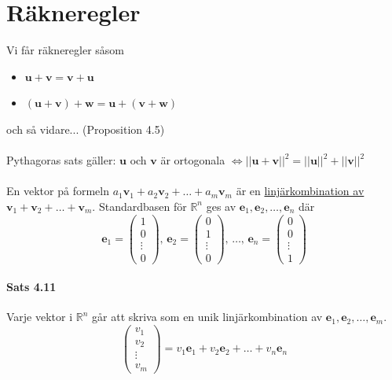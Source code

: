\clearpage

\section{Räkneregler}
Vi får räkneregler såsom
\begin{itemize}
    \item[] $\bm{u}+\bm{v}=\bm{v}+\bm{u}$
    \item[] $(\bm{u}+\bm{v})+\bm{w}=\bm{u}+(\bm{v}+\bm{w})$
\end{itemize}
och så vidare... (Proposition 4.5)\\
\\
Pythagoras sats gäller: $\bm{u}$ och $\bm{v}$ är ortogonala $\Leftrightarrow ||\bm{u}+\bm{v}||^{2}=||\bm{u}||^{2}+||\bm{v}||^{2}$\\
\\
En vektor på formeln $a_{1}\bm{v}_{1}+a_{2}\bm{v}_{2}+\ldots+a_{m}\bm{v}_{m}$ är en \underline{linjärkombination av $\bm{v}_{1}+\bm{v}_{2}+\ldots+\bm{v}_{m}$}.
Standardbasen för $\mathbb{R}^{n}$ ges av $\bm{e}_{1}, \bm{e}_{2}, \ldots, \bm{e}_{n}$ där 
\begin{equation*}
    \bm{e}_{1}=\begin{pmatrix}
        1\\0\\\vdots\\0
    \end{pmatrix}\text{, }
    \bm{e}_{2}=\begin{pmatrix}
        0\\1\\\vdots\\0
    \end{pmatrix}\text{, }
    \ldots\text{, }
    \bm{e}_{n}=\begin{pmatrix}
        0\\0\\\vdots\\1
    \end{pmatrix}
\end{equation*}
\paragraph{Sats 4.11} Varje vektor i $\mathbb{R}^{n}$ går att skriva som en unik linjärkombination av $\bm{e}_{1},\bm{e}_{2},\ldots,\bm{e}_{m}$.
\begin{equation*}
    \begin{pmatrix}
        v_{1}\\
        v_{2}\\
        \vdots\\
        v_{m}
    \end{pmatrix}=
    v_{1}\bm{e}_{1}+v_{2}\bm{e}_{2}+\ldots+v_{n}\bm{e}_{n}
\end{equation*}